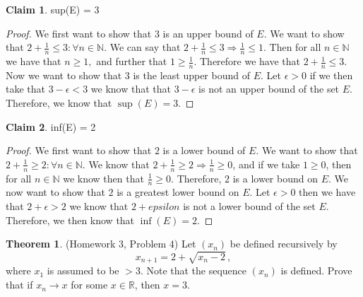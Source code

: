 \documentclass{article}
\theoremstyle{definition}
\newtheorem{claim}{Claim}
\newtheorem{theorem}{Theorem}
\newcommand{\N}{\mathbb{N}}
\newcommand{\R}{\mathbb{R}}
\begin{document}
\begin{claim}
sup(E) = 3
\end{claim}
\begin{proof}
We first want to show that $3$ is an upper bound of $E.$ We want to show that $2+\frac{1}{n} \leq 3: \forall n\in \mathbb{N}$. We can say that $2+\frac{1}{n}\leq 3 \Rightarrow \frac{1}{n}\leq 1.$ Then for all $n\in \mathbb{N}$ we have that $n\geq 1,$ and further that $1\geq \frac{1}{n}.$ Therefore we have that $2+\frac{1}{n}\leq 3.$ Now we want to show that $3$ is the least upper bound of $E$. Let $\epsilon > 0$ if we then take that $3-\epsilon < 3$ we know that that $3-\epsilon$ is not an upper bound of the set $E$. Therefore, we know that $\sup(E)=3.$
\end{proof}
\begin{claim}
inf(E) = 2
\end{claim}
\begin{proof}
We first want to show that $2$ is a lower bound of $E$. We want to show that $2+\frac{1}{n}\geq 2: \forall n\in \N$. We know that $2+\frac{1}{n}\geq 2\Rightarrow \frac{1}{n}\geq 0$, and if we take $1\geq 0$, then for all $n\in \N$ we know then that $\frac{1}{n}\geq 0$. Therefore, $2$ is a lower bound on $E$. We now want to show that $2$ is a greatest lower bound on $E$. Let $\epsilon > 0$ then we have that $2+\epsilon > 2 $ we know that $2+epsilon$ is not a lower bound of the set $E$. Therefore, we then know that $\inf(E) = 2.$
\end{proof}

\pagebreak
\begin{theorem}
(Homework 3, Problem 4) Let $(x_n)$ be defined recursively by 
\[
x_{n + 1} = 2 + \sqrt{x_n -2} \,,
\]
where $x_1$ is assumed to be $> 3$. Note that the sequence $(x_n)$ is defined. 
Prove that if $x_n \to x$ for some $x \in \R$, then $x = 3$. 
\end{theorem}
\end{document}
